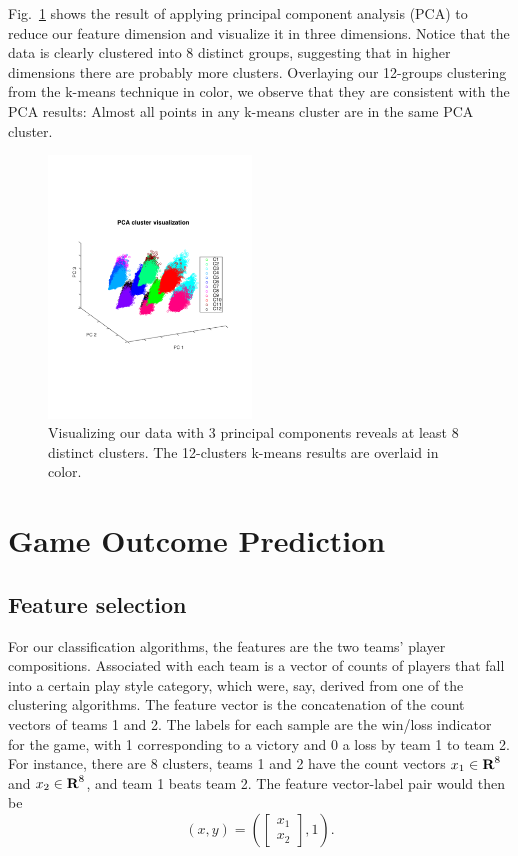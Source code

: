 \documentclass[letterpaper,10 pt,conference]{ieeeconf}
\begin{document}
Fig.~\ref{fig:viz} shows the result of applying principal component analysis (PCA) to reduce our feature dimension and visualize it in three dimensions. Notice that the data is clearly clustered into 8 distinct groups, suggesting that in higher dimensions there are probably more clusters. Overlaying our 12-groups clustering from the k-means technique in color, we observe that they are consistent with the PCA results: Almost all points in any k-means cluster are in the same PCA cluster. 

\begin{figure}[htbp!]
  \centering
  \includegraphics[trim=70pt 210pt 70pt 250pt, clip, width=0.48\textwidth]{viz-cluster.pdf}
  \caption{Visualizing our data with 3 principal components reveals at least 8 distinct clusters. The 12-clusters k-means results are overlaid in color.}
  \label{fig:viz}
\end{figure}

\section{Game Outcome Prediction}



\subsection{Feature selection}

For our classification algorithms, the features are the two teams' player compositions. Associated with each team is a vector of counts of players that fall into a certain play style category, which were, say, derived from one of the clustering algorithms. The feature vector is the concatenation of the count vectors of teams 1 and 2. The labels for each sample are the win/loss indicator for the game, with 1 corresponding to a victory and 0 a loss by team 1 to team 2. For instance, there are 8 clusters, teams 1 and 2 have the count vectors $x_{1}\in{\mbox{\bf R}}^{8}$ and $x_{2}\in{\mbox{\bf R}}^{8}$, and team 1 beats team 2. The feature vector-label pair would then be 
\[
  \left(x, y\right) = 
  \left(
    \left[
      \begin{array}{c}
        x_{1} \\ 
        x_{2}
      \end{array}
    \right],
    1
  \right).
\]
\end{document}
